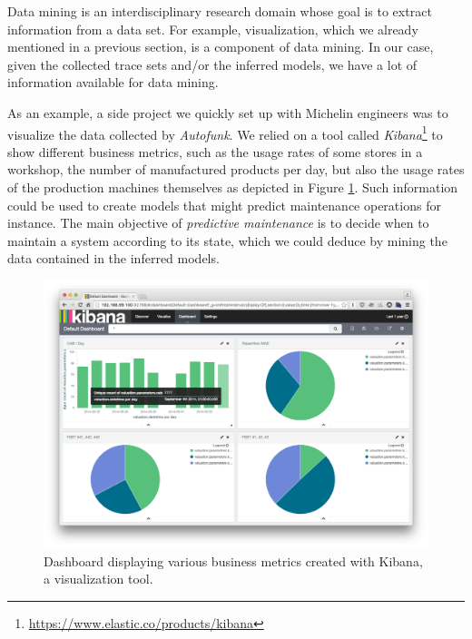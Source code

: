 Data mining \cite{chakrabarti2006data} is an interdisciplinary
research domain whose goal is to extract information from a data
set. For example, visualization, which we already mentioned in a
previous section, is a component of data mining. In our case,
given the collected trace sets and/or the inferred models, we
have a lot of information available for data mining.

As an example, a side project we quickly set up with Michelin
engineers was to visualize the data collected by
\textit{Autofunk}. We relied on a tool called
\emph{Kibana}\footnote{\url{https://www.elastic.co/products/kibana}}
to show different business metrics, such as the usage rates of
some stores in a workshop, the number of manufactured products
per day, but also the usage rates of the production machines
themselves as depicted in Figure \ref{fig:kibana}. Such
information could be used to create models that might predict
maintenance operations for instance.  The main objective of
\emph{predictive maintenance} \cite{mobley2002introduction} is to
decide when to maintain a system according to its state, which we
could deduce by mining the data contained in the inferred models.

\begin{figure}[h]
    \begin{center}
        \includegraphics[width=1.0\linewidth]{figures/kibana.png}
    \end{center}

    \caption{Dashboard displaying various business metrics
    created with Kibana, a visualization tool.}
    \label{fig:kibana}
\end{figure}

